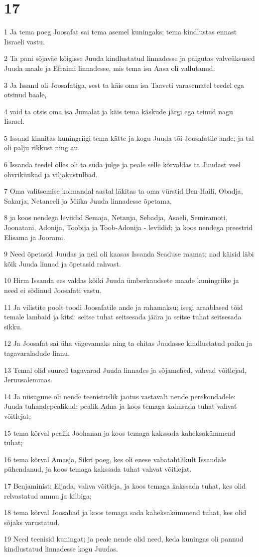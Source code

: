 \chapter{17}

\par 1 Ja tema poeg Joosafat sai tema asemel kuningaks; tema kindlustas ennast Iisraeli vastu.
\par 2 Ta pani sõjaväe kõigisse Juuda kindlustatud linnadesse ja paigutas valveüksused Juuda maale ja Efraimi linnadesse, mis tema isa Aasa oli vallutanud.
\par 3 Ja Issand oli Joosafatiga, sest ta käis oma isa Taaveti varasematel teedel ega otsinud baale,
\par 4 vaid ta otsis oma isa Jumalat ja käis tema käskude järgi ega teinud nagu Iisrael.
\par 5 Issand kinnitas kuningriigi tema kätte ja kogu Juuda tõi Joosafatile ande; ja tal oli palju rikkust ning au.
\par 6 Issanda teedel olles oli ta süda julge ja peale selle kõrvaldas ta Juudast veel ohvrikünkad ja viljakustulbad.
\par 7 Oma valitsemise kolmandal aastal läkitas ta oma vürstid Ben-Haili, Obadja, Sakarja, Netaneeli ja Miika Juuda linnadesse õpetama,
\par 8 ja koos nendega leviidid Semaja, Netanja, Sebadja, Asaeli, Semiramoti, Joonatani, Adonija, Toobija ja Toob-Adonija - leviidid; ja koos nendega preestrid Elisama ja Joorami.
\par 9 Need õpetasid Juudas ja neil oli kaasas Issanda Seaduse raamat; nad käisid läbi kõik Juuda linnad ja õpetasid rahvast.
\par 10 Hirm Issanda ees valdas kõiki Juuda ümberkaudsete maade kuningriike ja need ei sõdinud Joosafati vastu.
\par 11 Ja vilistite poolt toodi Joosafatile ande ja rahamaksu; isegi araablased tõid temale lambaid ja kitsi: seitse tuhat seitsesada jäära ja seitse tuhat seitsesada sikku.
\par 12 Ja Joosafat sai üha vägevamaks ning ta ehitas Juudasse kindlustatud paiku ja tagavaraladude linnu.
\par 13 Temal olid suured tagavarad Juuda linnades ja sõjamehed, vahvad võitlejad, Jeruusalemmas.
\par 14 Ja niisugune oli nende teenistuslik jaotus vastavalt nende perekondadele: Juuda tuhandepealikud: pealik Adna ja koos temaga kolmsada tuhat vahvat võitlejat;
\par 15 tema kõrval pealik Joohanan ja koos temaga kakssada kaheksakümmend tuhat;
\par 16 tema kõrval Amasja, Sikri poeg, kes oli enese vabatahtlikult Issandale pühendanud, ja koos temaga kakssada tuhat vahvat võitlejat.
\par 17 Benjaminist: Eljada, vahva võitleja, ja koos temaga kakssada tuhat, kes olid relvastatud ammu ja kilbiga;
\par 18 tema kõrval Joosabad ja koos temaga sada kaheksakümmend tuhat, kes olid sõjaks varustatud.
\par 19 Need teenisid kuningat; ja peale nende olid need, keda kuningas oli pannud kindlustatud linnadesse kogu Juudas.

